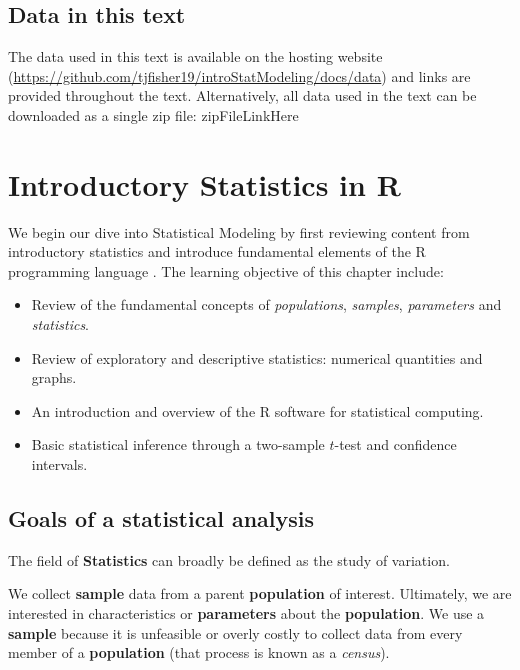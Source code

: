 \documentclass[
]{book}
\providecommand{\tightlist}{%
  \setlength{\itemsep}{0pt}\setlength{\parskip}{0pt}}
\begin{document}
\hypertarget{data-in-this-text}{%
\section*{Data in this text}\label{data-in-this-text}}

The data used in this text is available on the hosting website (\url{https://github.com/tjfisher19/introStatModeling/docs/data}) and links are provided throughout the text.
Alternatively, all data used in the text can be downloaded as a single zip file: zipFileLinkHere

\hypertarget{introductory-statistics-in-r}{%
\chapter{Introductory Statistics in R}\label{introductory-statistics-in-r}}

We begin our dive into Statistical Modeling by first reviewing content from introductory statistics and introduce fundamental elements of the R programming language \citep{R-base}. The learning objective of this chapter include:

\begin{itemize}
\tightlist
\item
  Review of the fundamental concepts of \emph{populations}, \emph{samples}, \emph{parameters} and \emph{statistics}.
\item
  Review of exploratory and descriptive statistics: numerical quantities and graphs.
\item
  An introduction and overview of the R software for statistical computing.
\item
  Basic statistical inference through a two-sample \(t\)-test and confidence intervals.
\end{itemize}

\hypertarget{goals-of-a-statistical-analysis}{%
\section{Goals of a statistical analysis}\label{goals-of-a-statistical-analysis}}

The field of \textbf{Statistics} can broadly be defined as the study of variation.

We collect \textbf{sample} data from a parent \textbf{population} of interest. Ultimately, we are interested in characteristics or \textbf{parameters} about the \textbf{population}. We use a \textbf{sample} because it is unfeasible or overly costly to collect data from every member of a \textbf{population} (that process is known as a \emph{census}).
\end{document}
